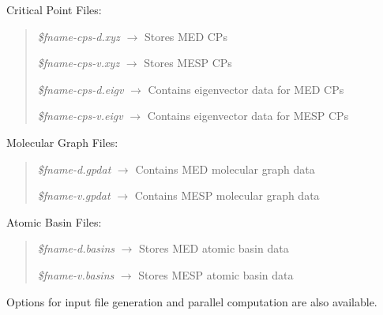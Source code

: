 \documentclass[10pt]{article}
\begin{document}
\begin{itemize}
\item Critical Point Files:
\vspace*{-5mm}
\begin{quote}
\item {\it \$fname-cps-d.xyz} $\rightarrow$ Stores MED CPs
\item {\it \$fname-cps-v.xyz} $\rightarrow$ Stores MESP CPs
\item {\it \$fname-cps-d.eigv} $\rightarrow$ Contains eigenvector data for MED CPs
\item {\it \$fname-cps-v.eigv} $\rightarrow$ Contains eigenvector data for MESP CPs
\end{quote}

\item Molecular Graph Files:
\vspace*{-5mm}
\begin{quote}
\item {\it \$fname-d.gpdat} $\rightarrow$ Contains MED molecular graph data
\item {\it \$fname-v.gpdat} $\rightarrow$ Contains MESP molecular graph data
\end{quote}

\item Atomic Basin Files:
\vspace*{-5mm}
\begin{quote}
\item {\it \$fname-d.basins} $\rightarrow$ Stores MED atomic basin data
\item {\it \$fname-v.basins} $\rightarrow$ Stores MESP atomic basin data
\end{quote}
\end{itemize}

Options for input file generation and parallel computation
are also available.
\end{document}
